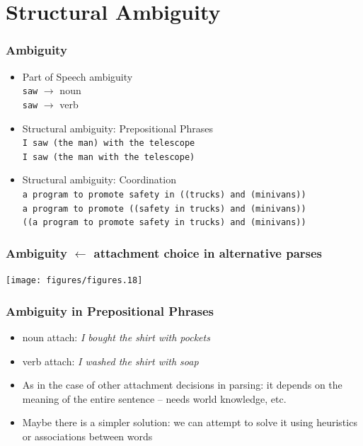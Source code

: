 \section{Structural Ambiguity}

\begin{frame}
\frametitle{Ambiguity}
\begin{itemize}
  \item Part of Speech ambiguity\\
        {\tt saw} $\rightarrow$ {\color{red}noun}\\
        {\tt saw} $\rightarrow$ {\color{red}verb}
  \item Structural ambiguity: Prepositional Phrases\\
        {\tt I saw (the man) with the telescope}\\
        {\tt I saw (the man with the telescope)}
  \item Structural ambiguity: Coordination\\
        {\tt a program to promote safety in ((trucks) and (minivans))}\\
        {\tt a program to promote ((safety in trucks) and (minivans))}\\
        {\tt ((a program to promote safety in trucks) and (minivans))}
\end{itemize}

\end{frame}

\begin{frame}[fragile]
\frametitle{Ambiguity $\leftarrow$ attachment choice in alternative parses}
\texttt{[image: figures/figures.18]}
\end{frame}

\begin{frame}
\frametitle{Ambiguity in Prepositional Phrases}
\begin{itemize}
\item<1-> noun attach: {\em I bought the shirt with pockets}
\item<2-> verb attach: {\em I washed the shirt with soap}
\item<3-> As in the case of other attachment decisions in parsing: it depends on the meaning of the entire sentence -- needs world knowledge, etc.
\item<4-> Maybe there is a simpler solution: we can attempt to solve it using heuristics or associations between words
\end{itemize}

\end{frame}

